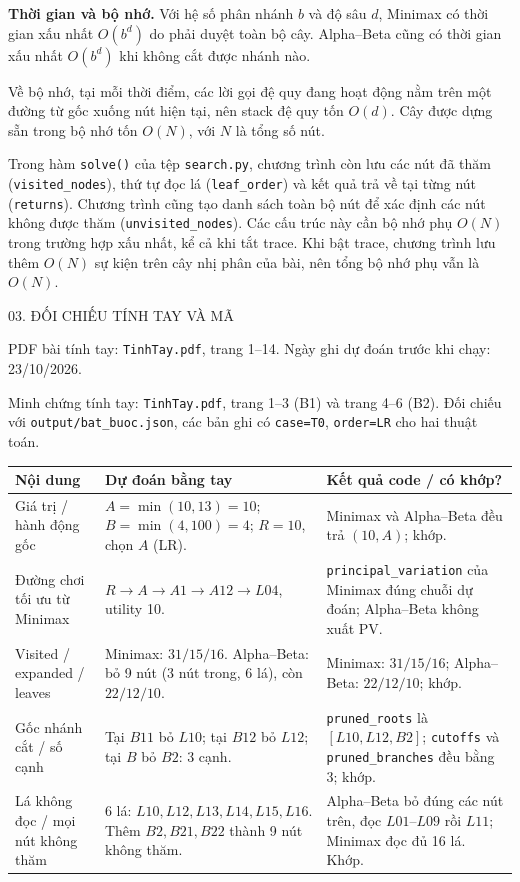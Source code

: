 \documentclass[11pt,a4paper]{article}
\newcommand{\head}[1]{\par\Needspace{3\baselineskip}\medskip{\large\sffamily\bfseries\color{Ink}#1}\par}
\newcommand{\pagehead}[1]{\clearpage\begin{tcolorbox}[colback=Ink,colframe=Ink,coltext=white,fontupper=\sffamily\large\bfseries,arc=1mm]#1\end{tcolorbox}}
\begin{document}
\textbf{Thời gian và bộ nhớ.}
Với hệ số phân nhánh $b$ và độ sâu $d$, Minimax có thời gian xấu nhất $O(b^d)$ do phải duyệt toàn bộ cây. Alpha--Beta cũng có thời gian xấu nhất $O(b^d)$ khi không cắt được nhánh nào.\par
Về bộ nhớ, tại mỗi thời điểm, các lời gọi đệ quy đang hoạt động nằm trên một đường từ gốc xuống nút hiện tại, nên stack đệ quy tốn $O(d)$. Cây được dựng sẵn trong bộ nhớ tốn $O(N)$, với $N$ là tổng số nút.\par
Trong hàm \texttt{solve()} của tệp \texttt{search.py}, chương trình còn lưu các nút đã thăm (\texttt{visited\_nodes}), thứ tự đọc lá (\texttt{leaf\_order}) và kết quả trả về tại từng nút (\texttt{returns}). Chương trình cũng tạo danh sách toàn bộ nút để xác định các nút không được thăm (\texttt{unvisited\_nodes}). Các cấu trúc này cần bộ nhớ phụ $O(N)$ trong trường hợp xấu nhất, kể cả khi tắt trace. Khi bật trace, chương trình lưu thêm $O(N)$ sự kiện trên cây nhị phân của bài, nên tổng bộ nhớ phụ vẫn là $O(N)$.\par\medskip
\pagehead{03. ĐỐI CHIẾU TÍNH TAY VÀ MÃ}
PDF bài tính tay: \texttt{TinhTay.pdf}, trang 1--14. Ngày ghi dự đoán trước khi chạy: 23/10/2026.\par\medskip
\head{4. T0: Minimax và Alpha–Beta}
Minh chứng tính tay: \texttt{TinhTay.pdf}, trang 1--3 (B1) và trang 4--6 (B2). Đối chiếu với \texttt{output/bat\_buoc.json}, các bản ghi có \texttt{case=T0}, \texttt{order=LR} cho hai thuật toán.\par\smallskip
\begingroup\footnotesize\renewcommand{\arraystretch}{1.45}\begin{tabularx}{\linewidth}{XXX}\toprule
\textbf{Nội dung} & \textbf{Dự đoán bằng tay} & \textbf{Kết quả code / có khớp?}\\\midrule
Giá trị / hành động gốc & $A=\min(10,13)=10$; $B=\min(4,100)=4$; $R=10$, chọn $A$ (LR). & Minimax và Alpha--Beta đều trả $(10,A)$; khớp.\\
Đường chơi tối ưu từ Minimax & $R\to A\to A1\to A12\to L04$, utility 10. & \texttt{principal\_variation} của Minimax đúng chuỗi dự đoán; Alpha--Beta không xuất PV.\\
Visited / expanded / leaves & Minimax: $31/15/16$. Alpha--Beta: bỏ 9 nút (3 nút trong, 6 lá), còn $22/12/10$. & Minimax: $31/15/16$; Alpha--Beta: $22/12/10$; khớp.\\
Gốc nhánh cắt / số cạnh & Tại $B11$ bỏ $L10$; tại $B12$ bỏ $L12$; tại $B$ bỏ $B2$: 3 cạnh. & \texttt{pruned\_roots} là $[L10,L12,B2]$; \texttt{cutoffs} và \texttt{pruned\_branches} đều bằng 3; khớp.\\
Lá không đọc / mọi nút không thăm & 6 lá: $L10,L12,L13,L14,L15,L16$. Thêm $B2,B21,B22$ thành 9 nút không thăm. & Alpha--Beta bỏ đúng các nút trên, đọc $L01$--$L09$ rồi $L11$; Minimax đọc đủ 16 lá. Khớp.\\
\bottomrule\end{tabularx}\endgroup\par\medskip
\end{document}
